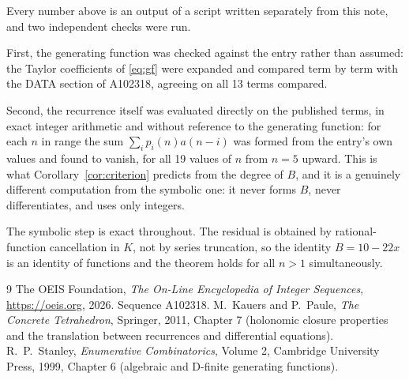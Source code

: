 \documentclass[11pt,a4paper]{article}
\theoremstyle{plain}
\theoremstyle{definition}
\begin{document}
Every number above is an output of a script written separately from this note, and two
independent checks were run.

First, the generating function was checked against the entry rather than assumed: the
Taylor coefficients of \eqref{eq:gf} were expanded and compared term by term with the DATA
section of A102318, agreeing on all 13 terms compared.

Second, the recurrence itself was evaluated directly on the published terms, in exact
integer arithmetic and without reference to the generating function: for each $n$ in range
the sum $\sum_{i}p_{i}(n)a(n-i)$ was formed from the entry's own values and found to
vanish, for all 19 values of $n$ from $n=5$ upward. This is what
Corollary~\ref{cor:criterion} predicts from the degree of $B$, and it is a genuinely
different computation from the symbolic one: it never forms $B$, never differentiates, and
uses only integers.

The symbolic step is exact throughout. The residual is obtained by rational-function
cancellation in $K$, not by series truncation, so the identity $B=10 - 22 x$ is an
identity of functions and the theorem holds for all $n>1$ simultaneously.

\begin{thebibliography}{9}
 The OEIS Foundation, \emph{The On-Line Encyclopedia of Integer Sequences},
\url{https://oeis.org}, 2026. Sequence A102318.
 M.~Kauers and P.~Paule, \emph{The Concrete Tetrahedron}, Springer, 2011,
Chapter 7 (holonomic closure properties and the translation between recurrences and
differential equations).
 R.~P.~Stanley, \emph{Enumerative Combinatorics}, Volume 2, Cambridge
University Press, 1999, Chapter 6 (algebraic and D-finite generating functions).
\end{thebibliography}
\end{document}
